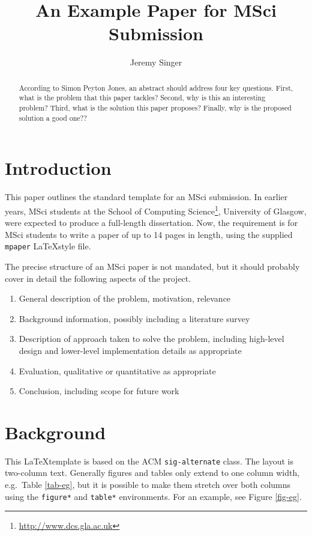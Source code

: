 \documentclass{mpaper}
\begin{document}
\title{An Example Paper for MSci Submission}
\author{Jeremy Singer}

\maketitle

\begin{abstract}
According to Simon Peyton Jones, an abstract should address
four key questions. First, what is the problem that this
paper tackles? Second, why is this an interesting problem?
Third, what is the solution this paper proposes?
Finally, why is the proposed solution a good one??
\end{abstract}

\section{Introduction}

This paper outlines the standard template for an MSci submission.
In earlier years, MSci students at the School of Computing
Science\footnote{\url{http://www.dcs.gla.ac.uk}},
University of Glasgow, were expected to produce a full-length
dissertation. Now, the requirement is for MSci students to
write a paper of up to 14 pages in length, using the supplied
\texttt{mpaper} \LaTeX style file.

The precise structure of an MSci paper is not mandated, but it should
probably cover in detail the following aspects of the project.
\begin{enumerate}
\item General description of the problem, motivation, relevance
\item Background information, possibly including a literature survey
\item Description of approach taken to solve the problem, including
  high-level design and lower-level implementation details as appropriate
\item Evaluation, qualitative or quantitative as appropriate
\item Conclusion, including scope for future work
\end{enumerate}

\section{Background}

This \LaTeX template is based on the ACM \texttt{sig-alternate} class.
The layout is two-column text. Generally figures and tables only
extend to one column width, e.g.\ Table \ref{tab-eg},
but it is possible to make them
stretch over both columns using the \texttt{figure*} and
\texttt{table*} environments. For an example, see Figure \ref{fig-eg}.
\end{document}
